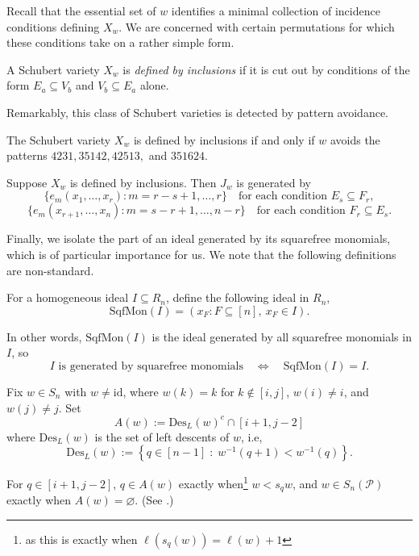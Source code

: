 Recall that the essential set of $w$ identifies a minimal collection of incidence conditions defining $X_w.$ We are concerned with certain permutations for which these conditions take on a rather simple form.

\begin{definition}
    A Schubert variety $X_w$ is \emph{defined by inclusions} if it is cut out by conditions of the form $E_a\subseteq V_b$ and $V_b\subseteq E_a$ alone.
\end{definition}

Remarkably, this class of Schubert varieties is detected by pattern avoidance. 

\begin{theorem}
    The Schubert variety $X_w$ is defined by inclusions if and only if $w$ avoids the patterns $4231,35142,42513,$ and $351624.$
\end{theorem}

\begin{proposition}\label{prop:e-relations}
    Suppose $X_w$ is defined by inclusions. Then $J_w$ is generated by
    \[
    \{e_m(x_1,\ldots,x_r): m = r-s+1,\ldots,r\}\quad\text{for each condition }E_s\subseteq F_r,
    \]
    \[
    \{e_m(x_{r+1},\ldots,x_n): m = s-r+1,\ldots,n-r\}\quad\text{for each condition }F_r\subseteq E_s.
    \]
\end{proposition}

Finally, we isolate the part of an ideal generated by its squarefree monomials, which is of particular importance for us. We note that the following definitions are non-standard.
\begin{definition}
\label{def:sqfr-mon-subideal}
For a homogeneous ideal \(I\subseteq R_n\), define the following ideal in $R_n$,
\[ \mathrm{SqfMon}(I)=\left( x_F:F\subseteq[n],\ x_F\in I\right). \]
\end{definition}

\begin{remark}
\label{rem:sqfr-mon-subideal}
In other words, \(\mathrm{SqfMon}(I)\) is the ideal generated by all squarefree monomials  in \(I\), so
\[ I\text{ is generated by squarefree monomials}\quad\Longleftrightarrow\quad \mathrm{SqfMon}(I)=I.
\]
\end{remark}

\begin{definition} \label{def:forbidden-ascents} 
Fix \(w\in S_n\) with \(w\neq\mathrm{id}\), where \(w(k)=k\) for \(k\notin[i,j]\), $w(i)\neq i$, and $w(j)\neq j$. 
Set 
\[ A(w):=\mathrm{Des}_L(w)^c\cap[i+1,j-2]\]
where $\mathrm{Des}_L(w)$ is the set of left descents of $w$, i.e, 
\[\mathrm{Des}_L(w) := \left\{q\in[n-1]\;:\;w^{-1}(q+1)<w^{-1}(q)\right\}.\]
\end{definition}

\begin{remark}
\label{rem:forbidden-ascents}
For $q\in[i+1,j-2]$,  \(q\in A(w)\) exactly when\footnote{as this is exactly when $\ell(s_q(w)) = \ell(w)+1$} \(w< s_qw\), and $w\in S_n(\mathcal{P})$ exactly when $A(w) = \varnothing$. (See .)
\end{remark}
